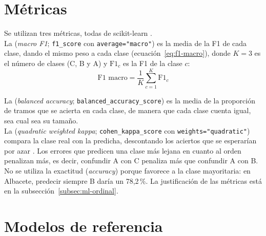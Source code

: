 \section{Métricas}
\label{sec:dis-metricas}

Se utilizan tres métricas, todas de scikit-learn \parencite{sklearn_metrics}.
\\

La  (\textit{macro F1}; \texttt{f1\_\allowbreak score} con \texttt{average=\allowbreak "macro"}) es la media de la F1 de cada clase, dando el mismo peso a cada clase (ecuación~\ref{eq:f1-macro}), donde $K = 3$ es el número de clases (C, B y A) y $\mathrm{F1}_c$ es la F1 de la clase $c$:
\begin{equation}
  \text{F1 macro} = \frac{1}{K} \sum_{c=1}^{K} \mathrm{F1}_c
  \label{eq:f1-macro}
\end{equation}

La  (\textit{balanced accuracy}; \texttt{balanced\_\allowbreak accuracy\_\allowbreak score}) es la media de la proporción de tramos que se acierta en cada clase, de manera que cada clase cuenta igual, sea cual sea su tamaño.
\\

La  (\textit{quadratic weighted kappa}; \texttt{cohen\_\allowbreak kappa\_\allowbreak score} con \texttt{weights=\allowbreak "quadratic"}) compara la clase real con la predicha, descontando los aciertos que se esperarían por azar \parencite{cohen1968}. Los errores que predicen una clase más lejana en cuanto al orden penalizan más, es decir, confundir A con C penaliza más que confundir A con B.
\\

No se utiliza la exactitud (\textit{accuracy}) porque favorece a la clase mayoritaria: en Albacete, predecir siempre B daría un 78,2\,\%. La justificación de las métricas está en la subsección~\ref{subsec:ml-ordinal}.
\\


\section{Modelos de referencia}
\label{sec:dis-modelos-referencia}

